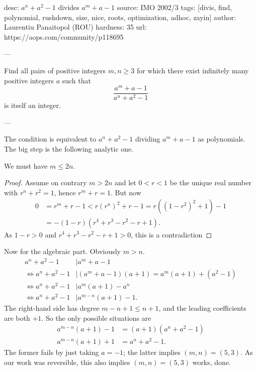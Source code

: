 desc:  $a^n+a^2-1$ divides $a^m+a-1$
source:  IMO 2002/3
tags:  [divis, find, polynomial, rushdown, size, nice, roots, optimization, adhoc, zayin]
author: Laurentiu Panaitopol (ROU)
hardness: 35
url: https://aops.com/community/p118695

---

Find all pairs of positive integers
$m, n \ge 3$ for which there exist infinitely many
positive integers $a$ such that
\[ \frac{a^m+a-1}{a^n+a^2-1} \]
is itself an integer.

---

The condition is equivalent to $a^n+a^2-1$
dividing $a^m+a-1$ as polynomials.
The big step is the following analytic one.

\begin{claim*}
  We must have $m \le 2n$.
\end{claim*}
\begin{proof}
  Assume on contrary $m > 2n$
  and let $0 < r < 1$ be the unique real number
  with $r^n+r^2 = 1$, hence $r^m+r = 1$.
  But now
  \begin{align*}
    0 &= r^m + r - 1 < r(r^n)^2 + r - 1 = r\left( (1-r^2)^2+1 \right) - 1 \\
    &= -(1-r)\left( r^4+r^3-r^2-r+1 \right).
  \end{align*}
  As $1-r > 0$ and $r^4+r^3-r^2-r+1 > 0$, this is a contradiction
\end{proof}

Now for the algebraic part.
Obviously $m > n$.
\begin{align*}
  a^n+a^2-1 &\mid a^m+a-1 \\
  \iff a^n+a^2-1 &\mid (a^m+a-1)(a+1) = a^m(a+1) + (a^2-1)  \\
  \iff a^n+a^2-1 &\mid a^m(a+1) - a^n \\
  \iff a^n+a^2-1 &\mid a^{m-n}(a+1) - 1.
\end{align*}
The right-hand side has degree $m-n+1 \le n+1$,
and the leading coefficients are both $+1$.
So the only possible situations are
\begin{align*}
  a^{m-n}(a+1) - 1 &= (a+1)\left( a^n+a^2-1 \right) \\
  a^{m-n}(a+1) + 1 &=  a^n+a^2-1.
\end{align*}
The former fails by just taking $a=-1$;
the latter implies $(m,n) = (5,3)$.
As our work was reversible, this also implies $(m,n) = (5,3)$ works, done.

